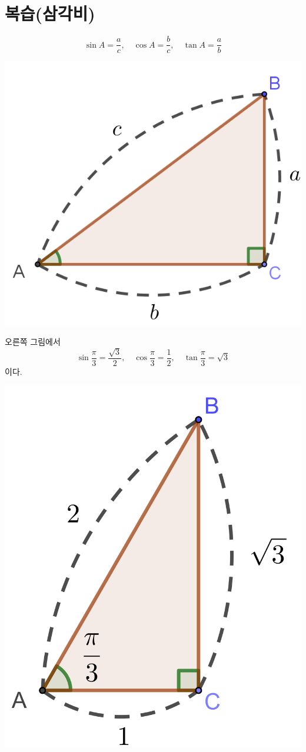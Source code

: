 \documentclass{oblivoir}
\begin{document}
\section{복습(삼각비)}
\begin{mdframed}
%
\label{tratio1}
\noindent\begin{minipage}{.6\textwidth}
\[\sin A=\frac ac,\quad\cos A=\frac bc,\quad\tan A=\frac ab\]
\end{minipage}
\begin{minipage}{.4\textwidth}
\centering
\includegraphics[width=.7\textwidth]{tratio_1}
\end{minipage}
\end{mdframed}

%
\label{tratio2}
\noindent\begin{minipage}{.6\textwidth}
오른쪽 그림에서
\[\sin\frac\pi3=\frac{\sqrt3}2,\quad\cos\frac\pi3=\frac12,\quad\tan\frac\pi3=\sqrt3\]
이다.
\end{minipage}
\begin{minipage}{.3\textwidth}
\centering
\includegraphics[width=.8\textwidth]{tratio_2}
\end{minipage}
\end{document}
